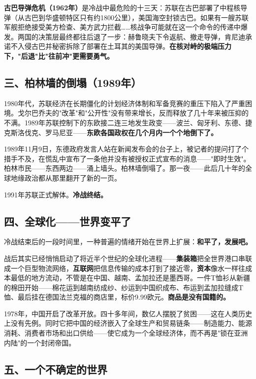 \documentclass[a4paper,12pt]{ctexart}
\begin{document}
\textbf{古巴导弹危机（1962年）}是冷战中最危险的十三天：苏联在古巴部署了中程核导弹（从古巴到华盛顿特区只有约1800公里），美国海空封锁古巴。如果有一艘苏联军舰拒绝接受美方检查、美方武力拦截……核战争可能就在这一个命令的传递中爆发。两国的决策层最终都往后退了一步：赫鲁晓夫下令返航、撤走导弹，肯尼迪承诺不入侵古巴并秘密拆除了部署在土耳其的美国导弹。\textbf{在核对峙的极端压力下，"后退"比"往前冲"更需要勇气。}

\subsection*{三、柏林墙的倒塌（1989年）}

1980年代，苏联经济在长期僵化的计划经济体制和军备竞赛的重压下陷入了严重困境。戈尔巴乔夫的"改革"和"公开性"没有带来增长，反而释放了几十年来被压抑的不满。1989年苏联控制下的东欧接二连三地发生政变——波兰、匈牙利、东德、捷克斯洛伐克、罗马尼亚——\textbf{东欧各国政权在几个月内一个个地倒下了。}

1989年11月9日，东德政府发言人站在新闻发布会的台子上，被记者的提问打了个措手不及，在慌乱中宣布了一条他并没有被授权正式宣布的消息——"即时生效"。柏林市民——东西两边——涌上墙头。柏林墙倒塌了。那一夜——此后几十年的全球地缘政治都从那里翻开了新的一页。

1991年苏联正式解体。\textbf{冷战终结。}

\subsection*{四、全球化——世界变平了}

冷战结束后的一段时间里，一种普遍的情绪开始在世界上扩展：\textbf{和平了，发展吧。}

战后其实已经悄悄启动了将近半个世纪的全球化进程——\textbf{集装箱}把全世界港口串联成一个巨型物流网络，\textbf{互联网}把信息传输的成本打到了接近零，\textbf{资本}像水一样往成本最低的地方流动，不管是在中国、越南、孟加拉还是墨西哥。一件T恤衫从新疆的棉田开始——棉花运到越南纺成纱、纱运到中国织成布、布运到孟加拉缝成T恤、最后挂在德国法兰克福的商店里，标价9.99欧元。\textbf{商品是没有国籍的。}

1978年，中国开启了改革开放。四十多年间，数亿人摆脱了贫困——这在人类历史上没有先例。同时它把中国的经济嵌入了全球生产和贸易链条——制造能力、能源消耗、消费者市场和出口供给——使它成为一个全球经济体，而不再是"锁在亚洲内陆"的一个封闭帝国。

\subsection*{五、一个不确定的世界}
\end{document}
